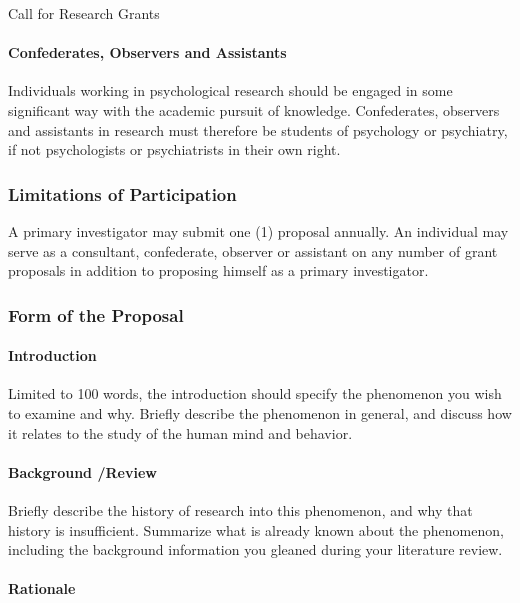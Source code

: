\begin{refsection}
\begin{apatextbox}{Call for Research Grants}
\paragraph{Confederates, Observers and Assistants}
\label{confederatesobserversandassistants}

Individuals working in psychological research should be engaged in some significant way with the academic pursuit of knowledge. Confederates, observers and assistants in research must therefore be students of psychology or psychiatry, if not psychologists or psychiatrists in their own right.

\subsubsection{Limitations of Participation}
\label{limitationsofparticipation}

A primary investigator may submit one (1) proposal annually. An individual may serve as a consultant, confederate, observer or assistant on any number of grant proposals in addition to proposing himself as a primary investigator. 

\subsubsection{Form of the Proposal}
\label{formoftheproposal}

\paragraph{Introduction}
\label{introduction}

Limited to 100 words, the introduction should specify the phenomenon you wish to examine and why. Briefly describe the phenomenon in general, and discuss how it relates to the study of the human mind and behavior.

\paragraph{Background \slash  Review}
\label{backgroundreview}

Briefly describe the history of research into this phenomenon, and why that history is insufficient. Summarize what is already known about the phenomenon, including the background information you gleaned during your literature review.

\paragraph{Rationale}
\label{rationale}


\end{apatextbox}
\end{refsection}
